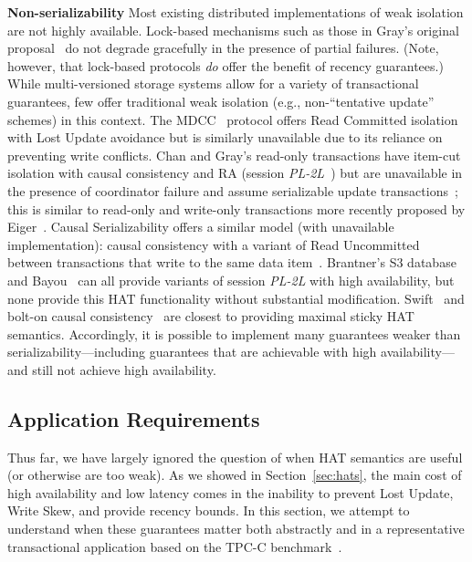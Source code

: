 \vspace{.5em}\noindent\textbf{Non-serializability} Most existing
distributed implementations of weak isolation are not highly
available. Lock-based mechanisms such as those in Gray's original proposal~\cite{gray-isolation} do not
degrade gracefully in the presence of partial failures. (Note,
however, that lock-based protocols \textit{do} offer the benefit of
recency guarantees.) While multi-versioned storage systems allow for a
variety of transactional guarantees, few offer traditional weak
isolation (e.g., non-``tentative update'' schemes) in this context.
The MDCC~\cite{mdcc} protocol offers Read Committed isolation with
Lost Update avoidance but is similarly unavailable due to its reliance
on preventing write conflicts. Chan and Gray's read-only transactions
have item-cut isolation with causal consistency and RA (session
\textit{PL-2L}~\cite{adya}) but are unavailable in the presence of coordinator
failure and assume serializable update transactions~\cite{readonly};
this is similar to read-only and write-only transactions more recently
proposed by Eiger~\cite{eiger}. Causal Serializability offers a
similar model (with unavailable implementation): causal consistency
with a variant of Read Uncommitted between transactions that write to
the same data item~\cite{raynal-causal}.  Brantner's S3
database~\cite{kraska-s3} and Bayou~\cite{sessionguarantees} can all
provide variants of session \textit{PL-2L} with high availability, but none
provide this HAT functionality without substantial
modification. Swift~\cite{swift} and bolt-on causal
consistency~\cite{bolton} are closest to providing maximal sticky HAT
semantics. Accordingly, it is possible to implement many
guarantees weaker than serializability---including guarantees that are
achievable with high availability---and still not achieve high
availability.

\subsection{Application Requirements}

Thus far, we have largely ignored the question of when HAT semantics
are useful (or otherwise are too weak). As we showed in
Section~\ref{sec:hats}, the main cost of high availability and low
latency comes in the inability to prevent Lost Update, Write Skew, and
provide recency bounds. In this section, we attempt to understand when
these guarantees matter both abstractly and in a representative
transactional application based on the TPC-C benchmark~\cite{tpcc}.

